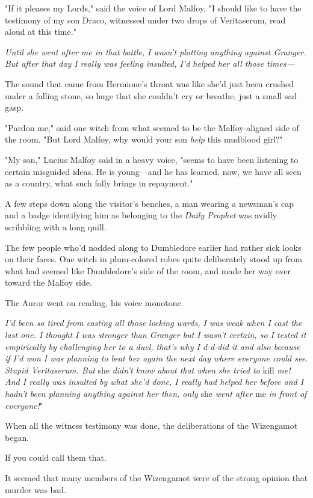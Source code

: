 "If it pleases my Lords," said the voice of Lord Malfoy, "I should like to have 
the testimony of my son Draco, witnessed under two drops of Veritaserum, read 
aloud at this time."

\emph{Until she went after me in that battle, I wasn't plotting anything 
against Granger. But after that day I really was feeling insulted, I'd helped 
her all those times---}

The sound that came from Hermione's throat was like she'd just been crushed 
under a falling stone, so huge that she couldn't cry or breathe, just a small 
sad gasp.

"Pardon me," said one witch from what seemed to be the Malfoy-aligned side of 
the room. "But Lord Malfoy, why would your son \emph{help} this mudblood girl?"

"My son," Lucius Malfoy said in a heavy voice, "seems to have been listening to 
certain misguided ideas. He is young---and he has learned, now, we have all 
seen as a country, what such folly brings in repayment."

A few steps down along the visitor's benches, a man wearing a newsman's cap and 
a badge identifying him as belonging to the \emph{Daily Prophet} was avidly 
scribbling with a long quill.

The few people who'd nodded along to Dumbledore earlier had rather sick looks 
on their faces. One witch in plum-colored robes quite deliberately stood up 
from what had seemed like Dumbledore's side of the room, and made her way over 
toward the Malfoy side.

The Auror went on reading, his voice monotone.

\emph{I'd been so tired from casting all those locking wards, I was weak when I 
cast the last one. I thought I was stronger than Granger but I wasn't certain, 
so I tested it empirically by challenging her to a duel, that's why I d-d-did 
it and also because if I'd won I was planning to beat her again the next day 
where everyone could see. Stupid Veritaserum. But} she\emph{ didn't know about 
that when she tried to} kill\emph{ me! And I really was insulted by what she'd 
done, I really had helped her before and I hadn't been planning anything 
against her then, only} she\emph{ went after} me\emph{ in front of everyone!}"

When all the witness testimony was done, the deliberations of the Wizengamot 
began.

If you could call them that.

It seemed that many members of the Wizengamot were of the strong opinion that 
murder was bad.

